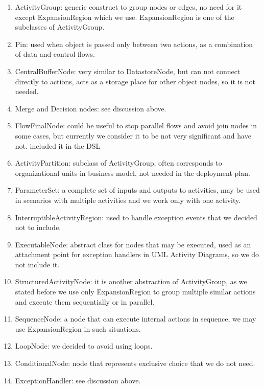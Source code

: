 \begin{enumerate}
\item  ActivityGroup: generic construct to group nodes or edges, no need for it except ExpansionRegion which we use. ExpansionRegion is one of the subclasses of ActivityGroup.

\item  Pin: used when object is passed only between two actions, as a combination of data and control flows.

\item  CentralBufferNode: very similar to DatastoreNode, but can not connect directly to actions, acts as a storage place for other object nodes, so it is not needed.

\item  Merge and Decision nodes: see discussion above.

\item  FlowFinalNode: could be useful to stop parallel flows and avoid join nodes in some cases, but currently we consider it to be not very significant and have not. included it in the DSL

\item  ActivityPartition: subclass of ActivityGroup, often corresponds to organizational units in business model, not needed in the deployment plan.

\item  ParameterSet: a complete set of inputs and outputs to activities, may be used in scenarios with multiple activities and we work only with one activity.

\item  InterruptibleActivityRegion: used to handle exception events that we decided not to include.

\item  ExecutableNode: abstract class for nodes that may be executed, used as an attachment point for exception handlers in UML Activity Diagrams, so we do not include it.

\item  StructuredActivityNode: it is another abstraction of ActivityGroup, as we stated before we use only ExpansionRegion to group multiple similar actions and execute them sequentially or in parallel.

\item  SequenceNode: a node that can execute internal actions in sequence, we may use ExpansionRegion in such situations.

\item  LoopNode: we decided to avoid using loops.

\item  ConditionalNode: node that represents exclusive choice that we do not need.

\item  ExceptionHandler: see discussion above.
\end{enumerate}

